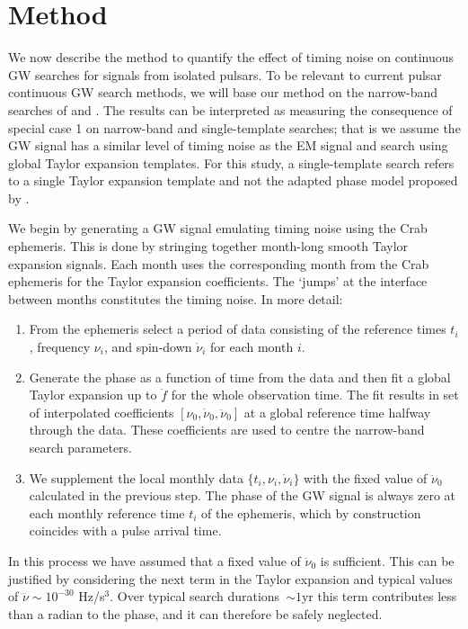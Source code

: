\documentclass[../full_thesis/full_thesis.tex]{subfiles}
\begin{document}
\section{Method}
\label{sec: narrow-band method}
We now describe the method to quantify the effect of timing noise on continuous GW
searches for signals from isolated pulsars.
To be relevant to current pulsar continuous GW search methods, we will base our
method on the narrow-band searches of \citet{ligo2008} and \citet{ligo2015}. The results can be interpreted as measuring the consequence of
special case 1 on narrow-band and single-template searches; that is we assume
the GW signal has a similar level of timing noise as the EM signal and search
using global Taylor expansion templates. For this study, a single-template
search refers to a single Taylor expansion template and not the adapted phase
model proposed by \citet{Pitkin2004}.

We begin by generating a GW signal emulating timing noise using the Crab
ephemeris. This is done by stringing together month-long smooth Taylor expansion
signals. Each month uses the corresponding month from the Crab
ephemeris for the Taylor expansion coefficients. The `jumps' at the interface
between months constitutes the timing noise.
In more detail:
\begin{enumerate}

\item From the ephemeris select a period of data consisting of the reference
times $t_i$, frequency $\nu_i$, and spin-down
$\dot{\nu}_i$ for each month $i$.

\item \label{fit} Generate the phase as a function of time from the data and
then fit a global Taylor expansion up to $\ddot{f}$ for the whole
observation time.  The fit results in set of interpolated coefficients
$[\nu_{0}, \dot{\nu}_{0}, \ddot{\nu}_{0}]$ at a global reference time halfway through
the data. These coefficients are used to centre the narrow-band search
parameters.

\item We supplement the local monthly data $\{t_i, \nu_{i}, \dot{\nu}_{i}\}$ with
the fixed value of $\ddot{\nu}_{0}$ calculated in the previous step. The phase of
the GW signal is always zero at each monthly reference time $t_i$ of the
ephemeris, which by construction coincides with a pulse arrival time.

\end{enumerate}

In this process we have assumed that a fixed value of $\ddot{\nu}_{0}$ is
sufficient. This can be justified by considering the next term in the Taylor
expansion and typical values of $\dddot{\nu} \sim 10^{-30}$
Hz/s$^{3}$.  Over typical search durations~$\sim 1$yr this term contributes
less than a radian to the phase, and it can therefore be safely neglected.
\end{document}
